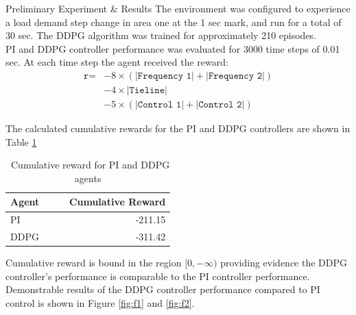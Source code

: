 \documentclass[final]{beamer}
\newlength{\onecolwid}
\begin{document}
\begin{frame}[t]
\begin{columns}[t]
\begin{column}{\onecolwid}
\vspace{-1.5cm}
\begin{block}{Preliminary Experiment \& Results}
	The environment was configured to experience a load demand step change in area one at the 1 sec mark, and run for a total of 30 sec. The DDPG algorithm was trained for approximately 210 episodes. \\
	\vspace{0.75cm}
	PI and DDPG controller performance was evaluated for 3000 time steps of 0.01 sec.  At each time step the agent received the reward:
	\vspace{0.75cm}
	\begin{equation*}
	\begin{split}
		\texttt{r} = &- 8 \times (|\texttt{Frequency 1}| + |\texttt{Frequency 2}|) \\
			  &- 4 \times |\texttt{Tieline}| \\
			  &- 5 \times (|\texttt{Control 1}| + |\texttt{Control 2}|)
	\end{split}
	\end{equation*}
	
	\vspace{0.75cm}
	
	The calculated cumulative rewards for the PI and DDPG controllers are shown in Table \ref{tab:1}
	
	\begin{table}
	\caption{ \ Cumulative reward for PI and DDPG agents}
	\label{tab:1}
		\begin{tabular}{lr}
		\toprule
		\textbf{Agent} \ \ \ & \textbf{Cumulative Reward} \\
		\midrule
		 PI & -211.15 \\
		 DDPG & -311.42 \\
		\bottomrule
		\end{tabular}
	\end{table}
	\vspace{0.75cm}
	Cumulative reward is bound in the region $[0, -\infty)$ providing evidence the DDPG controller's performance is comparable to the PI controller performance. Demonstrable results of the DDPG controller performance compared to PI control is shown in Figure \ref{fig:f1} and \ref{fig:f2}.
\end{block}

\vspace{-1cm}


\end{column}
\end{columns}
\end{frame}
\end{document}
